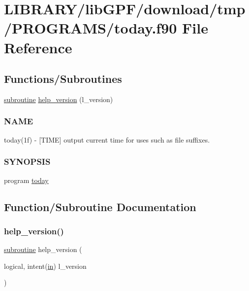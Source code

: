 \hypertarget{today_8f90}{}\section{L\+I\+B\+R\+A\+R\+Y/lib\+G\+P\+F/download/tmp/\+P\+R\+O\+G\+R\+A\+M\+S/today.f90 File Reference}
\label{today_8f90}
\subsection*{Functions/\+Subroutines}
\begin{DoxyCompactItemize}
\item 
\hyperlink{M__stopwatch_83_8txt_acfbcff50169d691ff02d4a123ed70482}{subroutine} \hyperlink{today_8f90_a39c21619b08a3c22f19e2306efd7f766}{help\+\_\+version} (l\+\_\+version)
\begin{DoxyCompactList}\small\item\em \subsubsection*{N\+A\+ME}

today(1f) -\/ \mbox{[}T\+I\+ME\mbox{]} output current time for uses such as file suffixes. \subsubsection*{S\+Y\+N\+O\+P\+S\+IS}\end{DoxyCompactList}\item 
program \hyperlink{today_8f90_a85de40d003821f9db87243b8b25b8d40}{today}
\end{DoxyCompactItemize}


\subsection{Function/\+Subroutine Documentation}
\mbox{\label{today_8f90_a39c21619b08a3c22f19e2306efd7f766}} 
\subsubsection{\texorpdfstring{help\+\_\+version()}{help\_version()}}
{\footnotesize\ttfamily \hyperlink{M__stopwatch_83_8txt_acfbcff50169d691ff02d4a123ed70482}{subroutine} help\+\_\+version (\begin{DoxyParamCaption}\item[{logical, intent(\hyperlink{M__journal_83_8txt_afce72651d1eed785a2132bee863b2f38}{in})}]{l\+\_\+version }\end{DoxyParamCaption})}



